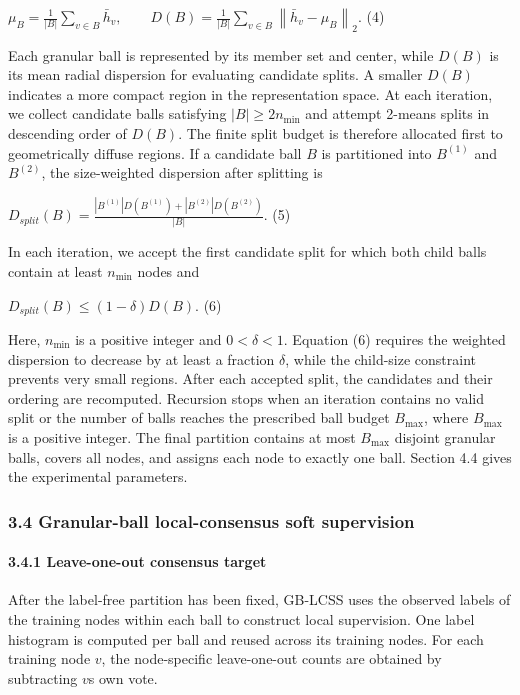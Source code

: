 \(\mu_{B} = \frac{1}{|B|}\sum_{v \in B}^{}{\bar{h}}_{v},\quad\quad D(B) = \frac{1}{|B|}\sum_{v \in B}^{}\left\| {\bar{h}}_{v} - \mu_{B} \right\|_{2}.\) (4)

Each granular ball is represented by its member set and center, while \(D(B)\) is its mean radial dispersion for evaluating candidate splits. A smaller \(D(B)\) indicates a more compact region in the representation space. At each iteration, we collect candidate balls satisfying \(|B| \geq 2n_{\min}\) and attempt 2-means splits in descending order of \(D(B)\). The finite split budget is therefore allocated first to geometrically diffuse regions. If a candidate ball \(B\) is partitioned into \(B^{(1)}\) and \(B^{(2)}\), the size-weighted dispersion after splitting is

\(D_{split}(B) = \frac{|B^{(1)}|D(B^{(1)}) + |B^{(2)}|D(B^{(2)})}{|B|}.\) (5)

In each iteration, we accept the first candidate split for which both child balls contain at least \(n_{\min}\) nodes and

\(D_{split}(B) \leq (1 - \delta)D(B).\) (6)

Here, \(n_{\min}\) is a positive integer and \(0 < \delta < 1\). Equation (6) requires the weighted dispersion to decrease by at least a fraction \(\delta\), while the child-size constraint prevents very small regions. After each accepted split, the candidates and their ordering are recomputed. Recursion stops when an iteration contains no valid split or the number of balls reaches the prescribed ball budget \(B_{\max}\), where \(B_{\max}\) is a positive integer. The final partition contains at most \(B_{\max}\) disjoint granular balls, covers all nodes, and assigns each node to exactly one ball. Section 4.4 gives the experimental parameters.

\subsubsection{3.4 Granular-ball local-consensus soft supervision}\label{granular-ball-local-consensus-soft-supervision}

\paragraph{3.4.1 Leave-one-out consensus target}\label{leave-one-out-consensus-target}

After the label-free partition has been fixed, GB-LCSS uses the observed labels of the training nodes within each ball to construct local supervision. One label histogram is computed per ball and reused across its training nodes. For each training node \(v\), the node-specific leave-one-out counts are obtained by subtracting \(v\)\textquotesingle s own vote.

